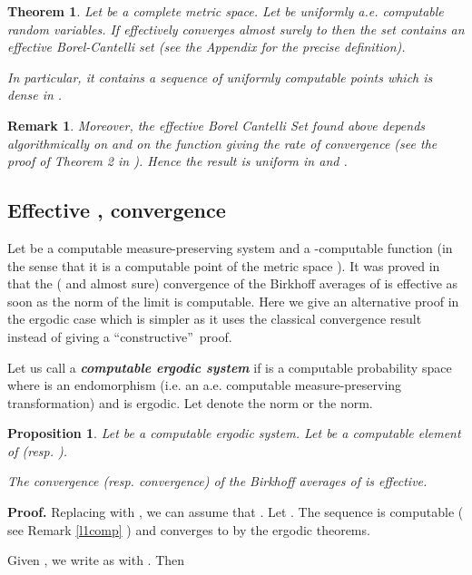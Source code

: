 \documentclass[copyright,creativecommons]{eptcs}
\newtheorem{theorem}{Theorem}
\newtheorem{proposition}{Proposition}
\newtheorem{remark}{Remark}
\numberwithin{equation}{section}
\begin{document}
\begin{theorem}
\label{theorem_convergence_Borel_Cantelli} Let  be a complete metric
space. Let  be uniformly a.e. computable random variables. If  effectively converges almost surely to  then the set  contains an effective Borel-Cantelli set
(see the Appendix for the precise definition).

In particular, it contains a sequence of uniformly computable points which
is dense in .
\end{theorem}

\begin{remark}
\label{remarkmistery}Moreover, the effective Borel Cantelli Set found above
depends algorithmically on  and on the function 
giving the rate of convergence (see the proof of Theorem 2 in \cite{GHR07}).
Hence the result is uniform in  and .
\end{remark}

\subsection{Effective ,  convergence}

Let  be a computable measure-preserving system and  a -computable function (in the sense that it is a computable point of the
metric space ). It was proved in \cite{AvigadGT10} that the ( and almost sure) convergence of the Birkhoff averages of  is
effective as soon as the norm of the limit  is computable. Here we give an
alternative proof in the ergodic case which is simpler as it uses the classical convergence
result instead of giving a \textquotedblleft constructive\textquotedblright\
proof.

Let us call  a \textbf{\emph{computable ergodic system}} if  is a computable probability space where  is an endomorphism
(i.e. an a.e. computable measure-preserving transformation) and 
is ergodic. Let  denote the  norm or the  norm.

\begin{proposition}
Let  be a computable ergodic system. Let  be a computable
element of  (resp. ).

The  convergence (resp.  convergence) of the Birkhoff averages of  is effective.
\end{proposition}

{\bf Proof.}
Replacing  with , we can assume that .
Let . The sequence 
is computable ( see Remark \ref{l1comp} ) and converges to  by the ergodic
theorems.

Given , we write  as  with . Then
\end{document}

